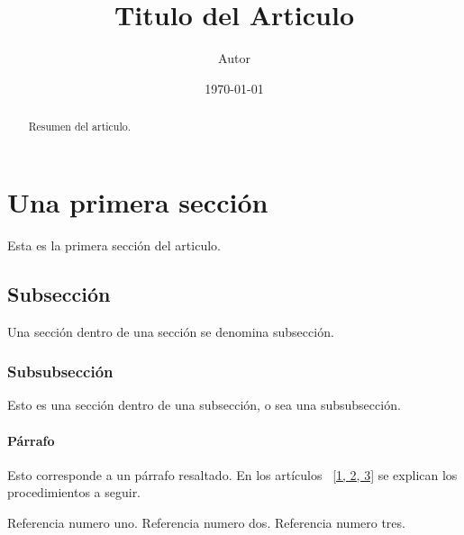 \documentclass[12pt]{article}
\title{Titulo del Articulo} %
\author{Autor} %
\date{\today} %
\begin{document}
     \maketitle
     
     \begin{abstract}
      Resumen del articulo.
     \end{abstract}
     
     \section{Una primera sección}
     Esta es la primera sección del articulo.
     
     \subsection{Subsección}
     Una sección dentro de una sección se denomina subsección.
     
     \subsubsection{Subsubsección}
     Esto es una sección dentro de una subsección, o sea una subsubsección.
     
     \paragraph{Párrafo}
     Esto corresponde a un párrafo resaltado. En los artículos ~\ref{1, 2, 3} se explican los procedimientos a seguir.

     \begin{thebibliography}{00}
          Referencia numero uno.
          Referencia numero dos.
          Referencia numero tres.
     \end{thebibliography}
\end{document}
